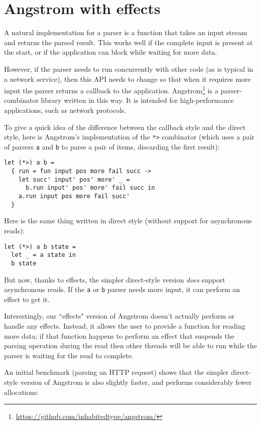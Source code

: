 \documentclass[a4paper,twocolumn]{article}
\begin{document}
\section*{Angstrom with effects}

A natural implementation for a parser is a function that takes an input stream and returns the parsed result.
This works well if the complete input is present at the start, or if the application can block while waiting for more data.

However, if the parser needs to run concurrently with other code (as is typical in a network service), then this API needs to change so that when it requires more input the parser returns a callback to the application.
Angstrom\footnote{\url{https://github.com/inhabitedtype/angstrom/}} is a parser-combinator library written in this way.
It is intended for high-performance applications, such as network protocols.

To give a quick idea of the difference between the callback style and the direct style, here is Angstrom's implementation of the \verb|*>| combinator (which uses a pair of parsers \verb|a| and \verb|b| to parse a pair of items, discarding the first result):
\begin{lstlisting}[style=ocaml]
let (*>) a b =
  { run = fun input pos more fail succ ->
    let succ' input' pos' more' _ =
      b.run input' pos' more' fail succ in
    a.run input pos more fail succ'
  }
\end{lstlisting}

Here is the same thing written in direct style (without support for asynchronous reads):
\begin{lstlisting}[style=ocaml]
let (*>) a b state =
  let _ = a state in
  b state
\end{lstlisting}


But now, thanks to effects, the simpler direct-style version \emph{does} support asynchronous reads.
If the \verb|a| or \verb|b| parser needs more input, it can perform an effect to get it.

Interestingly, our ``effects" version of Angstrom doesn't actually perform or handle any effects.
Instead, it allows the user to provide a function for reading more data;
if that function happens to perform an effect that suspends the parsing operation during the read
then other threads will be able to run while the parser is waiting for the read to complete.

An initial benchmark (parsing an HTTP request) shows that the simpler direct-style version of Angstrom is also slightly faster, and performs considerably fewer allocations:
\end{document}
